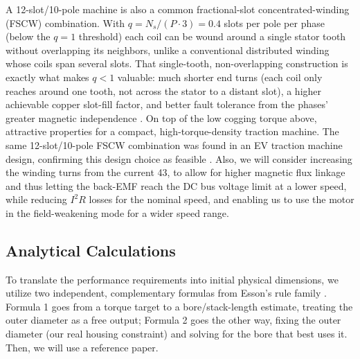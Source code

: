\documentclass[11pt,a4paper]{article}
\begin{document}
A 12-slot/10-pole machine is also a common fractional-slot concentrated-winding (FSCW) combination. With $q=N_s/(P\cdot3)=0.4$ slots per pole per phase (below the $q=1$ threshold) each coil can be wound around a single stator tooth without overlapping its neighbors, unlike a conventional distributed winding whose coils span several slots. That single-tooth, non-overlapping construction is exactly what makes $q<1$ valuable: much shorter end turns (each coil only reaches around one tooth, not across the stator to a distant slot), a higher achievable copper slot-fill factor, and better fault tolerance from the phases' greater magnetic independence \cite{ElRefaie2010}. On top of the low cogging torque above, attractive properties for a compact, high-torque-density traction machine. The same 12-slot/10-pole FSCW combination was found in an EV traction machine design, confirming this design choice as feasible \cite{Metwly2021}.
Also, we will consider increasing the winding turns from the current 43, to allow for higher magnetic flux linkage and thus letting the back-EMF reach the DC bus voltage limit at a lower speed, while reducing $I^2R$ losses for the nominal speed, and enabling us to use the motor in the field-weakening mode for a wider speed range.
\subsection*{Analytical Calculations}
To translate the performance requirements into initial physical dimensions, we utilize two independent, complementary formulas from Esson's rule family \cite{LucaLecture6}. Formula 1 goes from a torque target to a bore/stack-length estimate, treating the outer diameter as a free output; Formula 2 goes the other way, fixing the outer diameter (our real housing constraint) and solving for the bore that best uses it. Then, we will use a reference paper.
\end{document}
